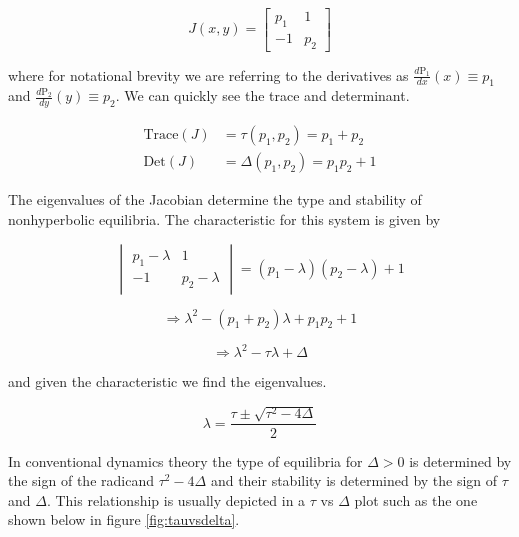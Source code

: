 \documentclass{article}
\begin{document}
\begin{equation}
J(x,y) = \begin{bmatrix}
       p_1 & 1 \\
       -1 & p_2
\end{bmatrix} \label{eq:jacobian}
 \end{equation}

\noindent where for notational brevity we are referring to the derivatives as
$\frac{d\text{P}_1}{dx}(x) \equiv p_1$ and $\frac{d\text{P}_2}{dy}(y) \equiv p_2$.
We can quickly see the trace and determinant.

\begin{align}
    \text{Trace}(J) &= \tau(p_1,p_2) = p_1 + p_2 \label{eq:trace} \\ 
    \text{Det}(J) &= \Delta(p_1,p_2) = p_1 p_2 +1 \label{eq:det}
\end{align}

\noindent The eigenvalues of the Jacobian determine the type and stability of
nonhyperbolic equilibria. The characteristic for this system is given by

\begin{equation*}
    \begin{vmatrix}
        p_1-\lambda & 1 \\
        -1 & p_2-\lambda
    \end{vmatrix} = (p_1-\lambda)(p_2-\lambda)+1 
\end{equation*}

\begin{equation*}
    \Rightarrow \lambda^2 - (p_1+p_2)\lambda + p_1 p_2 +1
\end{equation*}

\begin{equation}
    \Rightarrow \lambda^2-\tau \lambda+\Delta \label{eq:characteristic}
\end{equation}

\noindent and given the characteristic we find the eigenvalues.

\[\lambda = \frac{\tau \pm \sqrt{\tau^2-4\Delta}}{2}\]

\noindent In conventional dynamics theory the type of equilibria for $\Delta>0$ is determined by
the sign of the radicand $\tau^2-4\Delta$ and their stability is
determined by the sign of $\tau$ and $\Delta$. This relationship is usually
depicted in a $\tau$ vs $\Delta$ plot such as the one shown below in figure
\ref{fig:tauvsdelta}.
\end{document}
